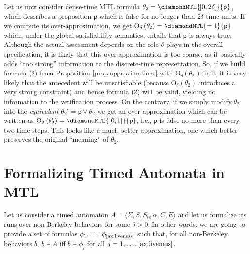 \documentclass[a4paper]{article}
\newcommand{\pp}{\mathsf{p}}
\newcommand{\overap}[1]{\mathrm{O}_{\delta}\left({#1}\right)}
\theoremstyle{plain}
\theoremstyle{definition}
\begin{document}
Let us now consider dense-time MTL formula $\theta_2 = \diamondMTL{[0,2\delta]}{\pp}$, which describes a proposition $\pp$ which is false for no longer than $2\delta$ time units.
If we compute its over-ap\-prox\-i\-ma\-tion, we get $\overap{\theta_2} = \diamondMTL{=1}{\pp}$ which, under the global satisfiability semantics, entails that $\pp$ is always true.
Although the actual assessment depends on the role $\theta$ plays in the overall specification, it is likely that this over-ap\-prox\-i\-ma\-tion is too coarse, as it basically adds ``too strong'' information to the discrete-time representation.
So, if we build formula (2) from Proposition \ref{prop:approximations} with $\overap{\theta_2}$ in it, it is very likely that the antecedent will be unsatisfiable (because $\overap{\theta_2}$ introduces a very strong constraint) and hence formula (2) will be valid, yielding no information to the verification process.
On the contrary, if we simply modify $\theta_2$ into the \emph{equivalent} $\theta_2' = \pp \vee \theta_2$ we get an over-ap\-prox\-i\-ma\-tion which can be written as $\overap{\theta_2'} = \diamondMTL{[0,1]}{\pp}$, i.e., $\pp$ is false no more than every two time steps.
This looks like a much better approximation, one which better preserves the original ``meaning'' of $\theta_2$.










\section{Formalizing Timed Automata in MTL} \label{sec:formalizingTAs}
Let us consider a timed automaton $A = \langle \Sigma, S, S_0, \alpha, C, E \rangle$ and let us formalize its runs over non-Berkeley behaviors for some $\delta > 0$.
In other words, we are going to provide a set of formulas $\phi_1, \ldots, \phi_{\textup{\ref{ax:liveness}}}$ such that, for all non-Berkeley behaviors $b$, $b \models A$ iff $b \models \phi_j$ for all $j = 1, \ldots, \ref{ax:liveness}$.
\end{document}
